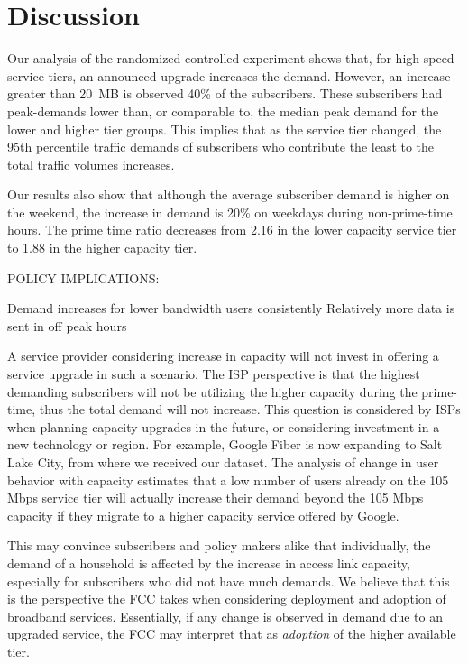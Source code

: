 \section{Discussion}\label{sec:discussion}

Our analysis of the randomized controlled experiment shows that, for high-speed
service tiers, an announced upgrade increases the demand. However, an increase
greater than 20~MB is observed 40\% of the subscribers. These subscribers
had peak-demands lower than, or comparable to, the median peak demand 
for the lower and higher tier groups. This implies that as the service tier
changed, the 95th percentile traffic demands of subscribers who contribute the
least to the total traffic volumes increases.

Our results also show that although the average subscriber demand is higher on the
weekend, the increase in demand is 20\% on weekdays during non-prime-time
hours. The prime time ratio decreases from 2.16 in the lower capacity service tier
to 1.88 in the higher capacity tier.



POLICY IMPLICATIONS:

Demand increases for lower bandwidth users consistently
Relatively more data is sent in off peak hours 


A service provider considering increase in 
capacity will not invest in offering a service upgrade in such a scenario. The 
ISP perspective is that the highest demanding subscribers will not be utilizing 
the higher capacity during the prime-time, thus the total demand will not 
increase. This question is considered by ISPs when planning capacity upgrades 
in the future, or considering investment in a new technology or region. For 
example, Google Fiber is now expanding to Salt Lake City, from where 
we received our dataset. The analysis of change in user behavior with capacity 
estimates that a low number of users already on the 105 Mbps service tier will 
actually increase their demand beyond the 105 Mbps capacity if they 
migrate to a higher capacity service offered by Google. 

This may 
convince subscribers and policy makers alike that individually, the demand of a 
household is affected by the increase in access link capacity, especially for 
subscribers who did not have much demands. We believe that this is the 
perspective the FCC takes when considering deployment and adoption of 
broadband services. Essentially, if any change is observed in demand due to an 
upgraded service, the FCC may interpret that as \emph{adoption} of the higher 
available tier.